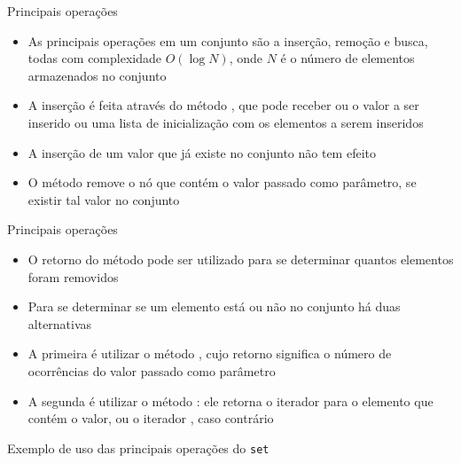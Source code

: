 \begin{frame}[fragile]{Principais operações}

    \begin{itemize}
        \item As principais operações em um conjunto são a inserção, remoção e busca,
        todas com complexidade $O(\log N)$, onde $N$ é o número de elementos armazenados
        no conjunto

        \item A inserção é feita através do método , que pode receber ou o
            valor a ser inserido ou uma lista de inicialização com os elementos a serem
            inseridos

        \item A inserção de um valor que já existe no conjunto não tem efeito

        \item O método  remove o nó que contém o valor passado como parâmetro,
            se existir tal valor no conjunto
    \end{itemize}

\end{frame}

\begin{frame}[fragile]{Principais operações}

    \begin{itemize}
        \item O retorno do método pode ser utilizado para se determinar quantos elementos foram
            removidos

        \item Para se determinar se um elemento está ou não no conjunto há duas alternativas

        \item A primeira é utilizar o método , cujo retorno significa o número
            de ocorrências do valor passado como parâmetro

        \item A segunda é utilizar o método : ele retorna o iterador para o
            elemento que contém o valor, ou o iterador , caso contrário
    \end{itemize}

\end{frame}

\begin{frame}[fragile]{Exemplo de uso das principais operações do \texttt{set}}
\end{frame}

